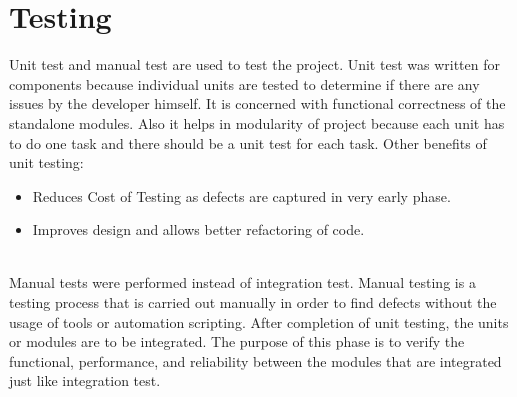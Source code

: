 \documentclass[conference]{IEEEtran}
\begin{document}
%



\section{Testing}
Unit test and manual test are used to test the project. Unit test was written for components because individual units are tested to determine if there are any issues by the developer himself. It is concerned with functional correctness of the standalone modules. Also it helps in modularity of project because each unit has to do one task and there should be a unit test for each task. Other benefits of unit testing:
\begin{itemize}
\item Reduces Cost of Testing as defects are captured in very early phase.
\item  Improves design and allows better refactoring of code.
\end{itemize}\\

Manual tests were performed instead of integration test. Manual testing is a testing process that is carried out manually in order to find defects without the usage of tools or automation scripting. After completion of unit testing, the units or modules are to be integrated. The purpose of this phase is to verify the functional, performance, and reliability between the modules that are integrated just like integration test.
\end{document}
